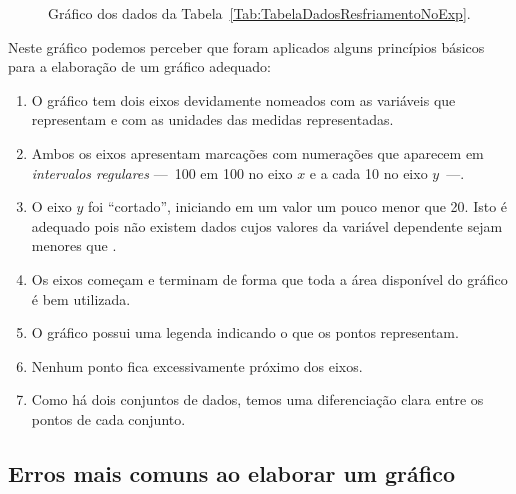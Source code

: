 \begin{figure}[!htb]\forceversofloat
\centering
\caption{Gráfico dos dados da Tabela~\ref{Tab:TabelaDadosResfriamentoNoExp}.}
\label{Fig:GraficoResfriamentoNoExp}

\end{figure}

Neste gráfico podemos perceber que foram aplicados alguns princípios básicos para a elaboração de um gráfico adequado:
\begin{enumerate}
	\item O gráfico tem dois eixos devidamente nomeados com as variáveis que representam e com as unidades das medidas representadas.
	\item Ambos os eixos apresentam marcações com numerações que aparecem em \emph{intervalos regulares} ---~100 em 100 no eixo $x$ e a cada 10 no eixo $y$~---.
	\item O eixo $y$ foi ``cortado'', iniciando em um valor um pouco menor que 20. Isto é adequado pois não existem dados cujos valores da variável dependente sejam menores que .
	\item Os eixos começam e terminam de forma que toda a área disponível do gráfico é bem utilizada.
	\item O gráfico possui uma legenda indicando o que os pontos representam.
	\item Nenhum ponto fica excessivamente próximo dos eixos.
	\item Como há dois conjuntos de dados, temos uma diferenciação clara entre os pontos de cada conjunto.
\end{enumerate}


\subsection{Erros mais comuns ao elaborar um gráfico}

